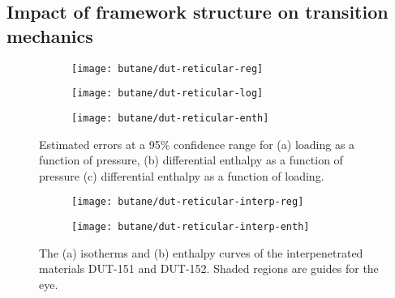 
\subsection{Impact of framework structure on transition mechanics}%
\label{dut:comparison}


\begin{figure}[htb]
    \centering
    \begin{subfigure}{0.33\linewidth}
        \texttt{[image: butane/dut-reticular-reg]}%
        \caption{}\label{dut:fgr:dut-reticular-reg}
    \end{subfigure}%
    \begin{subfigure}{0.33\linewidth}
        \texttt{[image: butane/dut-reticular-log]}%
        \caption{}\label{dut:fgr:dut-reticular-log}
    \end{subfigure}%
    \begin{subfigure}{0.33\linewidth}
        \texttt{[image: butane/dut-reticular-enth]}%
        \caption{}\label{dut:fgr:dut-reticular-enth}
    \end{subfigure}%
    \caption{Estimated errors at a 95\% confidence range for 
    (a) loading as a function of pressure, 
    (b) differential enthalpy as a function of pressure 
    (c) differential enthalpy as a function of loading.}%
    \label{dut:fgr:dut-reticular}
\end{figure}

\begin{figure}[htb]
    \centering
    \begin{subfigure}{0.5\linewidth}
        \texttt{[image: butane/dut-reticular-interp-reg]}%
        \caption{}\label{dut:fgr:dut-reticular-interp-reg}
    \end{subfigure}%
    \begin{subfigure}{0.5\linewidth}
        \texttt{[image: butane/dut-reticular-interp-enth]}%
        \caption{}\label{dut:fgr:dut-reticular-interp-log}
    \end{subfigure}%
    \caption{The (a) isotherms and (b) enthalpy curves of the
    interpenetrated materials DUT-151 and DUT-152. Shaded regions
    are guides for the eye.}%
    \label{dut:fgr:dut-reticular}
\end{figure}